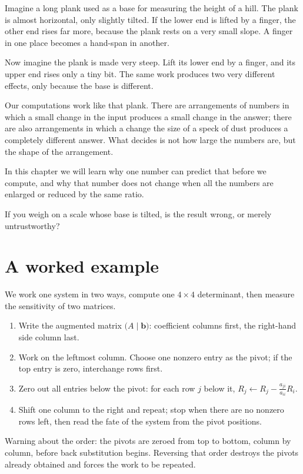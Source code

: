 \begin{untukanak}
Imagine a long plank used as a base for measuring the height of a hill. The plank is almost
horizontal, only slightly tilted. If the lower end is lifted by a finger, the other end rises
far more, because the plank rests on a very small slope. A finger in one place becomes a
hand-span in another.

Now imagine the plank is made very steep. Lift its lower end by a finger, and its upper end
rises only a tiny bit. The same work produces two very different effects, only because the base
is different.

Our computations work like that plank. There are arrangements of numbers in which a small change
in the input produces a small change in the answer; there are also arrangements in which a
change the size of a speck of dust produces a completely different answer. What decides is not
how large the numbers are, but the shape of the arrangement.

In this chapter we will learn why one number can predict that before we compute, and why that
number does not change when all the numbers are enlarged or reduced by the same ratio.

If you weigh on a scale whose base is tilted, is the result wrong, or merely untrustworthy?
\end{untukanak}

\section{A worked example}

We work one system in two ways, compute one $4\times4$ determinant, then measure the sensitivity
of two matrices.

\begin{resep}
\begin{enumerate}
  \item Write the augmented matrix $\bigl(A\mid\mathbf{b}\bigr)$: coefficient columns first, the
        right-hand side column last.
  \item Work on the leftmost column. Choose one nonzero entry as the pivot; if the top entry is
        zero, interchange rows first.
  \item Zero out all entries below the pivot: for each row $j$ below it,
        $R_{j}\leftarrow R_{j}-\frac{a_{ji}}{a_{ii}}R_{i}$.
  \item Shift one column to the right and repeat; stop when there are no nonzero rows left, then
        read the fate of the system from the pivot positions.
\end{enumerate}
Warning about the order: the pivots are zeroed from top to bottom, column by column, before back
substitution begins. Reversing that order destroys the pivots already obtained and forces the
work to be repeated.
\end{resep}

